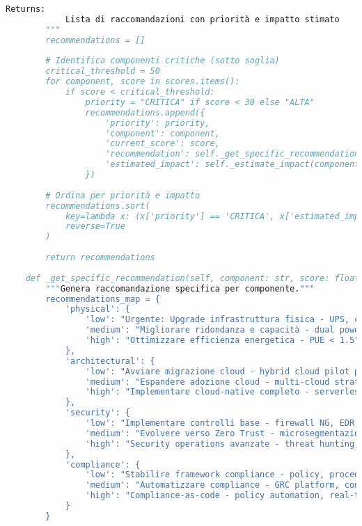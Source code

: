 \begin{lstlisting}[language=Python, caption={Implementazione completa GIST Calculator con validazione e reporting}]
        Returns:
            Lista di raccomandazioni con priorità e impatto stimato
        """
        recommendations = []
        
        # Identifica componenti critiche (sotto soglia)
        critical_threshold = 50
        for component, score in scores.items():
            if score < critical_threshold:
                priority = "CRITICA" if score < 30 else "ALTA"
                recommendations.append({
                    'priority': priority,
                    'component': component,
                    'current_score': score,
                    'recommendation': self._get_specific_recommendation(component, score),
                    'estimated_impact': self._estimate_impact(component, score)
                })
        
        # Ordina per priorità e impatto
        recommendations.sort(
            key=lambda x: (x['priority'] == 'CRITICA', x['estimated_impact']),
            reverse=True
        )
        
        return recommendations
    
    def _get_specific_recommendation(self, component: str, score: float) -> str:
        """Genera raccomandazione specifica per componente."""
        recommendations_map = {
            'physical': {
                'low': "Urgente: Upgrade infrastruttura fisica - UPS, cooling, connettività fiber",
                'medium': "Migliorare ridondanza e capacità - dual power, N+1 cooling",
                'high': "Ottimizzare efficienza energetica - PUE < 1.5"
            },
            'architectural': {
                'low': "Avviare migrazione cloud - hybrid cloud pilot per servizi non critici",
                'medium': "Espandere adozione cloud - multi-cloud strategy, containerization",
                'high': "Implementare cloud-native completo - serverless, edge computing"
            },
            'security': {
                'low': "Implementare controlli base - firewall NG, EDR, patch management",
                'medium': "Evolvere verso Zero Trust - microsegmentazione, SIEM/SOAR",
                'high': "Security operations avanzate - threat hunting, deception technology"
            },
            'compliance': {
                'low': "Stabilire framework compliance - policy, procedure, training base",
                'medium': "Automatizzare compliance - GRC platform, continuous monitoring",
                'high': "Compliance-as-code - policy automation, real-time attestation"
            }
        }
        

\end{lstlisting}
